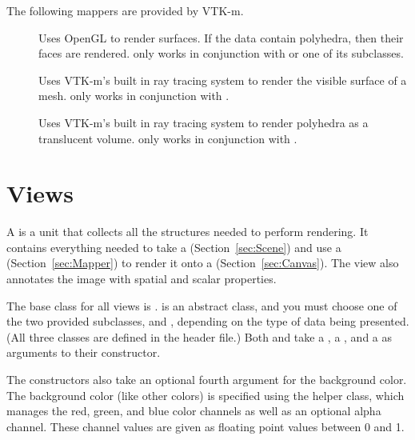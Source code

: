 The following mappers are provided by VTK-m.

\begin{description}
\item[] Uses OpenGL to render surfaces. If the data
  contain polyhedra, then their faces are rendered.
   only works in conjunction with
   or one of its subclasses.
\item[] Uses VTK-m's built in ray tracing
  system to render the visible surface of a mesh.
   only works in conjunction with
  .
\item[] Uses VTK-m's built in ray tracing
  system to render polyhedra as a translucent volume.
   only works in conjunction with
  .
\end{description}



\section{Views}


A  is a unit that collects all the structures needed to
perform rendering. It contains everything needed to take a
 (Section~\ref{sec:Scene}) and use a
 (Section~\ref{sec:Mapper}) to render it onto a
 (Section~\ref{sec:Canvas}). The view also annotates
the image with spatial and scalar properties.

The base class for all views is . 
is an abstract class, and you must choose one of the two provided
subclasses,  and , depending on
the type of data being presented. (All three classes are defined in the
 header file.) Both
 and  take a
, a , and a
 as arguments to their constructor.


The  constructors also take an optional fourth
argument for the background color. The background color (like other colors)
is specified using the  helper class, which manages
the red, green, and blue color channels as well as an optional alpha
channel. These channel values are given as floating point values between 0
and 1.

